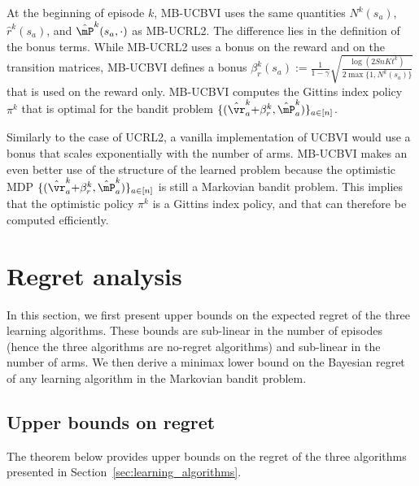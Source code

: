 At the beginning of episode $k$, MB-UCBVI uses the same quantities $N^{k}(s_a)$, $\hat{r}^{k}(s_a)$, and $\hat{\mP}^{k}(s_a,\cdot)$ as MB-UCRL2. The difference lies in the definition of the bonus terms. While MB-UCRL2 uses a bonus on the reward and on the transition matrices, MB-UCBVI defines a bonus $\beta^{k}_r(s_a){:=}\frac{1}{1-\gamma}\sqrt{\frac{\log(2SnKt^k)}{2\max\{1,N^{k}(s_a)\}}}$ that is used on the reward only. MB-UCBVI computes the Gittins index policy $\pi^k$ that is optimal for the bandit problem $\{(\hat{\vr}^{k}_a {+}\beta^{k}_{r}, \hat{\mP}^{k}_a)\}_{a\in[n]}$. 

Similarly to the case of UCRL2, a vanilla implementation of UCBVI would use a bonus that scales exponentially with the number of arms. MB-UCBVI makes an even  better use of the structure of the learned problem because the optimistic MDP $\{(\hat{\vr}^{k}_a {+}\beta^{k}_{r}, \hat{\mP}^{k}_a)\}_{a\in[n]}$ is still a Markovian bandit problem. This implies that the optimistic policy $\pi^k$ is a Gittins index policy, and that can therefore be computed efficiently.

\section{Regret analysis}
\label{sec:analysis}

In this section, we first present upper bounds on the expected regret of the three learning algorithms.  These bounds are sub-linear in the number of episodes (hence the three algorithms are no-regret algorithms) and sub-linear in the number of arms. We then derive a minimax lower bound on the Bayesian regret of any learning algorithm in the Markovian bandit problem. 

\subsection{Upper bounds on regret}
\label{ssec:upper_bound_psrl}

The theorem below provides upper bounds on the regret of the three algorithms presented in Section~\ref{sec:learning_algorithms}. %

